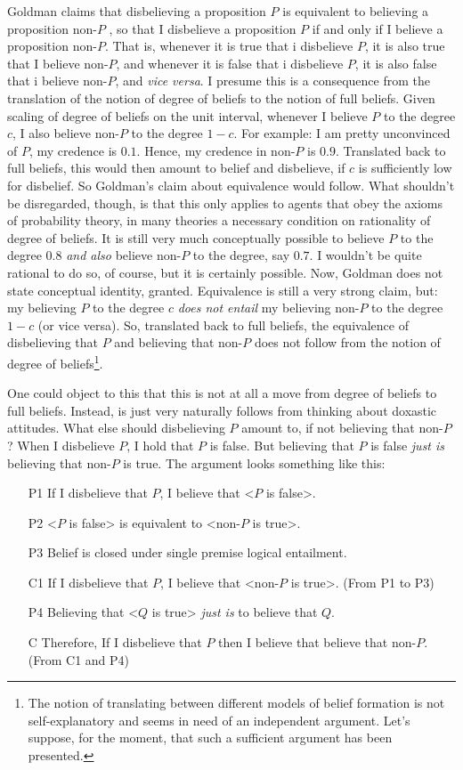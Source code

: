 \documentclass[12pt,numbers=noenddot]{scrartcl}
\begin{document}
Goldman claims that disbelieving a proposition $P$ is equivalent to believing a proposition non-$P$ \textcite[58]{Goldman2002-GOLTUO-2}, so that I disbelieve a proposition $P$ if and only if I believe a proposition non-$P$. That is, whenever it is true that i disbelieve $P$, it is also true that I believe non-$P$, and whenever it is false that i disbelieve $P$, it is also false that i believe non-$P$, and \emph{vice versa}. I presume this is a consequence from the translation of the notion of degree of beliefs to the notion of full beliefs. Given scaling of degree of beliefs on the unit interval, whenever I believe $P$ to the degree $c$, I also believe non-$P$ to the degree $1-c$. For example: I am pretty unconvinced of $P$, my credence is $0.1$. Hence, my credence in non-$P$ is $0.9$. Translated back to full beliefs, this would then amount to belief and disbelieve, if $c$ is sufficiently low for disbelief. So Goldman's claim about equivalence would follow. What shouldn't be disregarded, though, is that this only applies to agents that obey the axioms of probability theory, in many theories a necessary condition on rationality of degree of beliefs. It is still very much conceptually possible to believe $P$ to the degree $0.8$ \emph{and also} believe non-$P$ to the degree, say $0.7$. I wouldn't be quite rational to do so, of course, but it is certainly possible. Now, Goldman does not state conceptual identity, granted. Equivalence is still a very strong claim, but: my believing $P$ to the degree $c$ \emph{does not entail} my believing non-$P$ to the degree $1-c$ (or vice versa). So, translated back to full beliefs, the equivalence of disbelieving that $P$ and believing that non-$P$ does not follow from the notion of degree of beliefs\footnote{The notion of translating between different models of belief formation is not self-explanatory and seems in need of an independent argument. Let's suppose, for the moment, that such a sufficient argument has been presented.}.

One could object to this that this is not at all a move from degree of beliefs to full beliefs. Instead, is just very naturally follows from thinking about doxastic attitudes. What else should disbelieving $P$ amount to, if not believing that non-$P$? When I disbelieve $P$, I hold that $P$ is false. But believing that $P$ is false \emph{just is} believing that non-$P$ is true. The argument looks something like this:

\begin{enumerate}
\item [P1] If I disbelieve that $P$, I believe that <$P$ is false>. 
\item [P2] <$P$ is false> is equivalent to <non-$P$ is true>.
\item [P3] Belief is closed under single premise logical entailment.
\item [C1] If I disbelieve that $P$, I believe that <non-$P$ is true>. (From P1 to P3)
\item [P4] Believing that <$Q$ is true> \emph{just is} to believe that $Q$.
\item [C] Therefore, If I disbelieve that $P$ then I believe that believe that non-$P$. (From C1 and P4)
\end{enumerate}
\end{document}
